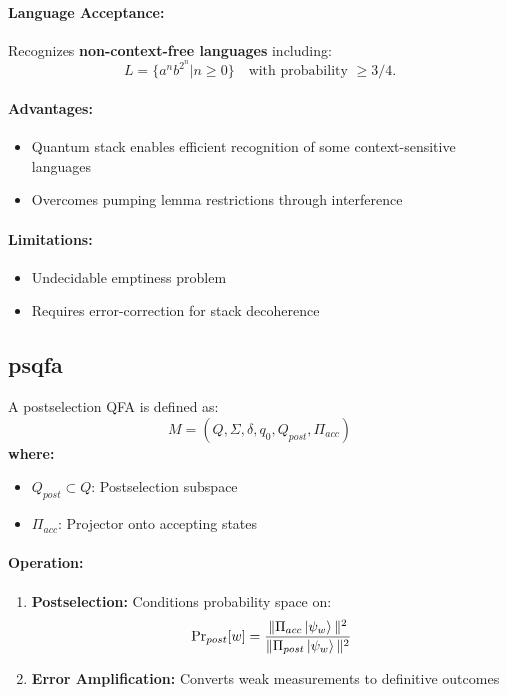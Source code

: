 \paragraph{Language Acceptance:}
Recognizes \textbf{non-context-free languages} including:
\[
L = \{a^nb^{2^n} | n \geq 0\} \quad \text{with probability } \geq 3/4. 
\]
\cite{bertoni2001quantum}

\paragraph{Advantages:}
\begin{itemize}
    \item Quantum stack enables efficient recognition of some context-sensitive languages \cite{ambainis2002quantum}
    \item Overcomes pumping lemma restrictions through interference
\end{itemize}

\paragraph{Limitations:}
\begin{itemize}
    \item Undecidable emptiness problem
    \item Requires error-correction for stack decoherence
\end{itemize}

\subsection{\acrfull{psqfa}}
\label{subsec:psqfa}

\begin{definition}
A postselection QFA \cite{aaronson2005complexity} is defined as:
\[
M = (Q, \Sigma, \delta, q_0, Q_{post}, \Pi_{acc})
\]
\textbf{where:}
\begin{itemize}
    \item $Q_{post} \subset Q$: Postselection subspace
    \item $\Pi_{acc}$: Projector onto accepting states
\end{itemize}
\end{definition}

\paragraph{Operation:}
\begin{enumerate}
    \item \textbf{Postselection:} Conditions probability space on:
    \[
    \text{Pr}_{post}[w] = \frac{\|\Pi_{acc}\ket{\psi_w}\|^2}{\|\Pi_{post}\ket{\psi_w}\|^2}
    \]
    \item \textbf{Error Amplification:} Converts weak measurements to definitive outcomes \cite{yamakami2014constant}
\end{enumerate}

